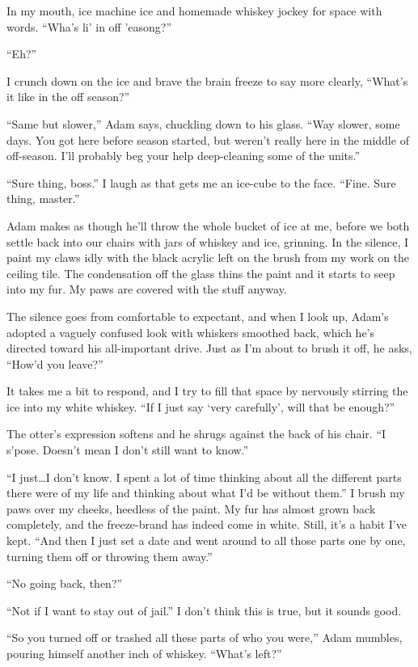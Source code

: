 In my mouth, ice machine ice and homemade whiskey jockey for space with words. ``Wha's li' in off 'easong?''

``Eh?''

I crunch down on the ice and brave the brain freeze to say more clearly, ``What's it like in the off season?''

``Same but slower,'' Adam says, chuckling down to his glass. ``Way slower, some days. You got here before season started, but weren't really here in the middle of off-season. I'll probably beg your help deep-cleaning some of the units.''

``Sure thing, boss.'' I laugh as that gets me an ice-cube to the face. ``Fine. Sure thing, master.''

Adam makes as though he'll throw the whole bucket of ice at me, before we both settle back into our chairs with jars of whiskey and ice, grinning. In the silence, I paint my claws idly with the black acrylic left on the brush from my work on the ceiling tile. The condensation off the glass thins the paint and it starts to seep into my fur. My paws are covered with the stuff anyway.

The silence goes from comfortable to expectant, and when I look up, Adam's adopted a vaguely confused look with whiskers smoothed back, which he's directed toward his all-important drive. Just as I'm about to brush it off, he asks, ``How'd you leave?''

It takes me a bit to respond, and I try to fill that space by nervously stirring the ice into my white whiskey. ``If I just say `very carefully', will that be enough?''

The otter's expression softens and he shrugs against the back of his chair. ``I s'pose. Doesn't mean I don't still want to know.''

``I just\ldots{}I don't know. I spent a lot of time thinking about all the different parts there were of my life and thinking about what I'd be without them.'' I brush my paws over my cheeks, heedless of the paint. My fur has almost grown back completely, and the freeze-brand has indeed come in white. Still, it's a habit I've kept. ``And then I just set a date and went around to all those parts one by one, turning them off or throwing them away.''

``No going back, then?''

``Not if I want to stay out of jail.'' I don't think this is true, but it sounds good.

``So you turned off or trashed all these parts of who you were,'' Adam mumbles, pouring himself another inch of whiskey. ``What's left?''

